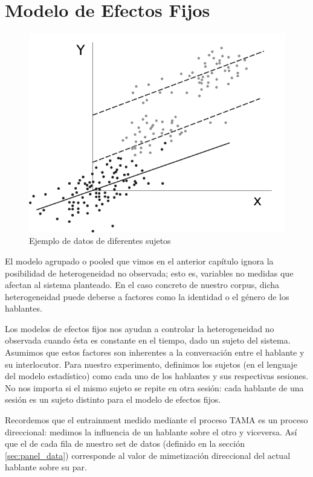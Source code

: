 \section{Modelo de Efectos Fijos}

\begin{figure}[t]
\centering
\includegraphics[scale=1]{images/fixed_effects_example.pdf}
\caption{Ejemplo de datos de diferentes sujetos}
\label{fig:efectos_fijo}
\end{figure}



\newcommand{\slopeestim}[1] { $\estslope \sim #1$ }

El modelo agrupado o pooled que vimos en el anterior capítulo ignora la posibilidad de heterogeneidad no observada; esto es, variables no medidas que afectan al sistema planteado. En el caso concreto de nuestro corpus, dicha heterogeneidad puede deberse a factores como la identidad o el género de los hablantes.

Los modelos de efectos fijos nos ayudan a controlar la heterogeneidad no observada cuando ésta es constante en el tiempo, dado un sujeto del sistema. Asumimos que estos factores son inherentes a la conversación entre el hablante y su interlocutor. Para nuestro experimento, definimos los sujetos (en el lenguaje del modelo estadístico) como cada uno de los hablantes y sus respectivas sesiones. No nos importa si el mismo sujeto se repite en otra sesión: cada hablante de una sesión es un sujeto distinto para el modelo de efectos fijos.

Recordemos que el entrainment medido mediante el proceso TAMA es un proceso direccional: medimos la influencia de un hablante sobre el otro y viceversa. Así que el \entrainment de cada fila de nuestro set de datos (definido en la sección \ref{sec:panel_data}) corresponde al valor de mimetización direccional del actual hablante sobre su par.



